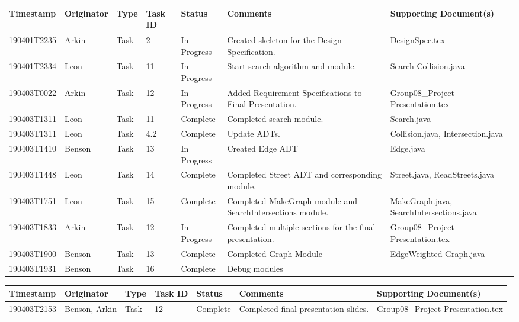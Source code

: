 \documentclass[12pt]{article}
\begin{document}
\begin{center}
    \begin{tabular}{| P{2.5cm} | P{2.2cm} | P{1.4cm} | P{0.9cm} | P{1.9cm} | P{2.8cm} | P{3cm} |}
        \hline
        \textbf{Timestamp} & \textbf{Originator} & \textbf{Type} 
        & \textbf{Task ID} & \textbf{Status} & \textbf{Comments} 
        & \textbf{Supporting Document(s)}\\
        \hline
        190401T2235 & Arkin & Task & 2 & In Progress & Created skeleton for the Design Specification. & DesignSpec.tex \\
        \hline
        190401T2334 & Leon & Task & 11 & In Progress & Start search algorithm and module. & Search-Collision.java \\
        \hline
        190403T0022 & Arkin & Task & 12 & In Progress & Added Requirement Specifications to Final Presentation. & Group08\_Project-Presentation.tex \\
        \hline
        190403T1311 & Leon & Task & 11 & Complete & Completed search module. & Search.java \\
        \hline
        190403T1311 & Leon & Task & 4.2 & Complete & Update ADTs. & Collision.java, Intersection.java \\
        \hline
        190403T1410 & Benson & Task & 13 & In Progress & Created Edge ADT & Edge.java\\
        \hline
        190403T1448 & Leon & Task & 14 & Complete & Completed Street ADT and corresponding module. & Street.java, ReadStreets.java \\
        \hline
        190403T1751 & Leon & Task & 15 & Complete & Completed MakeGraph module and SearchIntersections module. & MakeGraph.java, SearchIntersections.java \\
        \hline
        190403T1833 & Arkin & Task & 12 & In Progress & Completed multiple sections for the final presentation. & Group08\_Project-Presentation.tex \\
        \hline
        190403T1900 & Benson & Task & 13 & Complete & Completed Graph Module &
        EdgeWeighted
        Graph.java \\
        \hline
        190403T1931 & Benson & Task & 16 & Complete & Debug modules & \\
        \hline
    \end{tabular}
    
    \begin{tabular}{| P{2.5cm} | P{2.2cm} | P{1.4cm} | P{0.9cm} | P{1.9cm} | P{2.8cm} | P{3cm} |}
        \hline
        \textbf{Timestamp} & \textbf{Originator} & \textbf{Type} 
        & \textbf{Task ID} & \textbf{Status} & \textbf{Comments} 
        & \textbf{Supporting Document(s)}\\
        \hline
        190403T2153 & Benson, Arkin & Task & 12 & Complete & Completed final presentation slides. & Group08\_Project-Presentation.tex \\
        \hline
    \end{tabular}
    \end{center}
\end{document}
